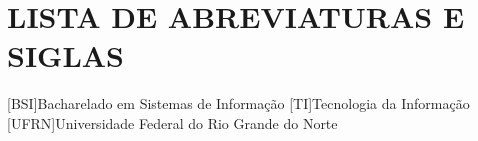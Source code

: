 \thispagestyle{empty}

\chapter*{\normalsize{\textbf{LISTA DE ABREVIATURAS E SIGLAS}}}



\begin{acronym}[]
    \hypersetup{colorlinks=true, linkcolor=black, urlcolor=black}
    [BSI]{Bacharelado em Sistemas de Informação}
    [TI]{Tecnologia da Informação}
    [UFRN]{Universidade Federal do Rio Grande do Norte}       %
\end{acronym}

\newpage